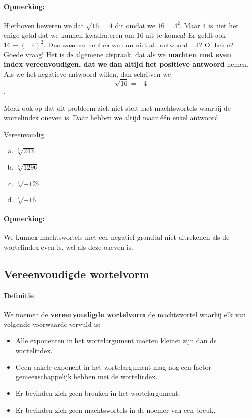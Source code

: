 \documentclass[12pt,twoside]{article}
\begin{document}
\paragraph*{Opmerking: }
Hierboven beweren we dat $\sqrt{16} = 4$ dit omdat we $16=4^2$. Maar $4$ is niet het enige getal dat we kunnen kwadrateren om $16$ uit te komen! Er geldt ook $16=(-4)^2$. Dus waarom hebben we dan niet als antwoord $-4$? Of beide? Goede vraag! Het is de algemene afspraak, dat als we \textbf{machten met even index vereenvoudigen, dat we dan altijd het positieve antwoord} nemen. Als we het negatieve antwoord willen, dan schrijven we $$- \sqrt {16} = - 4$$.

Merk ook op dat dit probleem zich niet stelt met machtswortels waarbij de wortelindex oneven is. Daar hebben we altijd maar één enkel antwoord.

\begin{oefening}
  Vereenvoudig
  \begin{multicols}{2}
    \begin{enumerate}[(a)]
      \itemsep1em
    \item \(\sqrt[5]{{243}}\)
    \item \(\sqrt[4]{{1296}}\)
    \item \(\sqrt[3]{{ - 125}}\)
    \item \(\sqrt[4]{{ - 16}}\)
    \end{enumerate}
  \end{multicols}
\end{oefening}

\paragraph*{Opmerking: }
We kunnen machtswortels met een negatief grondtal niet uitrekenen als de wortelindex even is, wel als deze oneven is.

\subsection{Vereenvoudigde wortelvorm}

\paragraph{Definitie}
\begin{mdframed}
  We noemen de \textbf{vereenvoudigde wortelvorm} de machtswortel waarbij elk van volgende voorwaarde vervuld is:
  \begin{itemize}
  \item Alle exponenten in het wortelargument moeten kleiner zijn dan de wortelindex.
  \item Geen enkele exponent in het wortelargument mag nog een factor gemeenschappelijk hebben met de wortelindex.
  \item Er bevinden zich geen breuken in het wortelargument.
  \item Er bevinden zich geen machtswortels in de noemer van een breuk.
  \end{itemize}
\end{mdframed}
\end{document}
